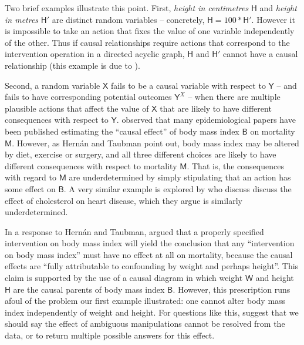 \documentclass{article}
\theoremstyle{plain}
\theoremstyle{definition}
\newcommand{\RV}[1]{\ensuremath{\mathsf{#1}}}
\begin{document}
Two brief examples illustrate this point. First, \emph{height in centimetres} $\RV{H}$ and \emph{height in metres} $\RV{H}'$ are distinct random variables -- concretely, $\RV{H}=100*\RV{H}'$. However it is impossible to take an action that fixes the value of one variable independently of the other. Thus if causal relationships require actions that correspond to the intervention operation in a directed acyclic graph, $\RV{H}$ and $\RV{H}'$ cannot have a causal relationship (this example is due to \citet{eberhardt_contemporary_2022}).

Second, a random variable $\RV{X}$ fails to be a causal variable with respect to $\RV{Y}$ -- and fails to have corresponding potential outcomes $\RV{Y}^X$ -- when there are multiple plausible actions that affect the value of $\RV{X}$ that are likely to have different consequences with respect to $\RV{Y}$. \citet{hernan_does_2008} observed that many epidemiological papers have been published estimating the ``causal effect'' of body mass index $\RV{B}$ on mortality $\RV{M}$. However, as Hernán and Taubman point out, body mass index may be altered by diet, exercise or surgery, and all three different choices are likely to have different consequences with respect to mortality $\RV{M}$. That is, the consequences with regard to $\RV{M}$ are underdetermined by simply stipulating that an action has some effect on $\RV{B}$. A very similar example is explored by  \citet{spirtes_causal_2004,eberhardt_contemporary_2022} who discuss discuss the effect of cholesterol on heart disease, which they argue is similarly underdetermined.


In a response to Hernán and Taubman, \citet{shahar_association_2009} argued that a properly specified intervention on body mass index will yield the conclusion that any ``intervention on body mass index'' must have no effect at all on mortality, because the causal effects are ``fully attributable to confounding by weight and perhaps height''. This claim is supported by the use of a causal diagram in which weight $\RV{W}$ and height $\RV{H}$ are the causal parents of body mass index $\RV{B}$. However, this prescription runs afoul of the problem our first example illustrated: one cannot alter body mass index independently of weight and height. For questions like this, \citet{spirtes_causal_2004} suggest that we should say the effect of ambiguous manipulations cannot be resolved from the data, or to return multiple possible answers for this effect.
\end{document}
